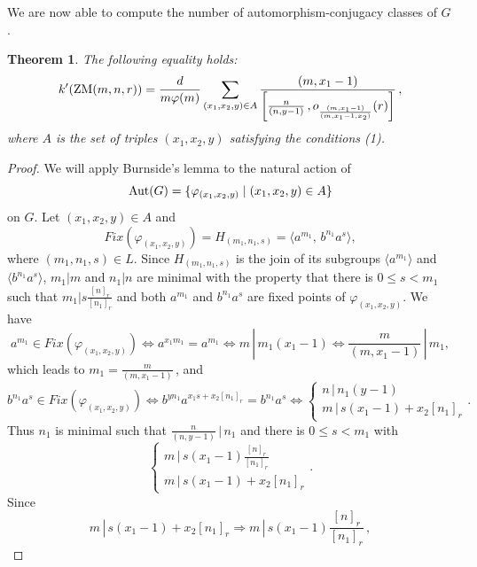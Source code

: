 \documentclass[12pt]{article}
\newtheorem{theorem}{Theorem}[section]
\newcommand{\dd}{\displaystyle }
\newcommand{\0}{{\leqno}}
\def\barr{\begin{array}}
\def\earr{\end{array}}
\begin{document}
We are now able to compute the number of automorphism-conjugacy classes of $G$.

\begin{theorem}
The following equality holds:
\begin{equation}
k'({\rm ZM}(m,n,r))=\dd\frac{d}{m\varphi(m)}\dd\sum_{(x_1,x_2,y)\in A}\frac{(m,x_1-1)}{\left[\frac{n}{(n,y-1)}\,, o_{\frac{(m,x_1-1)}{(m,x_1-1,x_2)}}(r)\right]}\,,
\end{equation}where $A$ is the set of triples $(x_1,x_2,y)$ satisfying the conditions (1).
\end{theorem}

\begin{proof}
We will apply Burnside's lemma to the natural action of $${\rm Aut}(G)=\{\varphi_{(x_1,x_2,y)}\mid (x_1,x_2,y)\in A\}$$on $G$. Let $(x_1,x_2,y)\in A$ and
\begin{equation}
Fix(\varphi_{(x_1,x_2,y)})=H_{(m_1,n_1,s)}=\langle a^{m_1},\, b^{n_1}a^s\rangle,\nonumber
\end{equation}where $(m_1,n_1,s)\in L$. Since $H_{(m_1,n_1,s)}$ is the join of its subgroups $\langle a^{m_1}\rangle$ and $\langle b^{n_1}a^s\rangle$, $m_1|m$ and $n_1|n$ are minimal with the property that there is $0\leq s<m_1$ such that $m_1|s\frac{[n]_r}{[n_1]_r}$ and both $a^{m_1}$ and $b^{n_1}a^s$ are fixed points of $\varphi_{(x_1,x_2,y)}$. We have
\begin{equation}
a^{m_1}\!\in\! Fix(\varphi_{(x_1,x_2,y)})\!\Leftrightarrow\! a^{x_1m_1}\!\!=a^{m_1}\!\Leftrightarrow\! m\,|\,m_1(x_1-1)\!\Leftrightarrow\!\frac{m}{(m,x_1-1)}\,|\,m_1,\nonumber
\end{equation}which leads to $m_1=\frac{m}{(m,x_1-1)}$\,, and
\begin{equation}
b^{n_1}a^s\!\in\! Fix(\varphi_{(x_1,x_2,y)})\!\Leftrightarrow\! b^{yn_1}a^{x_1s+x_2[n_1]_r}\!\!=b^{n_1}a^s\!\Leftrightarrow\!\left\{\barr{lll}
\!\!n\,|\,n_1(y-1)\\
\!\!m\,|\,s(x_1-1)+x_2[n_1]_r\earr\right..\nonumber
\end{equation}Thus $n_1$ is minimal such that $\frac{n}{(n,y-1)}\,|\,n_1$ and there is $0\leq s<m_1$ with
\begin{equation}
\left\{\barr{lll}
\!\!m\,|\,s(x_1-1)\frac{[n]_r}{[n_1]_r}\\
\!\!m\,|\,s(x_1-1)+x_2[n_1]_r\earr\right..\nonumber
\end{equation}Since 
\begin{equation}
m\,|\,s(x_1-1)+x_2[n_1]_r\Rightarrow m\,|\,s(x_1-1)\frac{[n]_r}{[n_1]_r}\,,\nonumber

\end{equation}
\end{proof}
\end{document}
